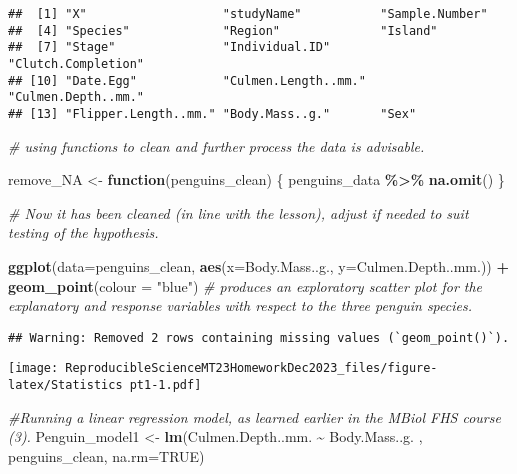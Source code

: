 \documentclass[
]{article}
\newenvironment{Shaded}{\begin{snugshade}}{\end{snugshade}}
\newcommand{\AttributeTok}[1]{\textcolor[rgb]{0.13,0.29,0.53}{#1}}
\newcommand{\CommentTok}[1]{\textcolor[rgb]{0.56,0.35,0.01}{\textit{#1}}}
\newcommand{\ConstantTok}[1]{\textcolor[rgb]{0.56,0.35,0.01}{#1}}
\newcommand{\ControlFlowTok}[1]{\textcolor[rgb]{0.13,0.29,0.53}{\textbf{#1}}}
\newcommand{\FunctionTok}[1]{\textcolor[rgb]{0.13,0.29,0.53}{\textbf{#1}}}
\newcommand{\NormalTok}[1]{#1}
\newcommand{\OtherTok}[1]{\textcolor[rgb]{0.56,0.35,0.01}{#1}}
\newcommand{\SpecialCharTok}[1]{\textcolor[rgb]{0.81,0.36,0.00}{\textbf{#1}}}
\newcommand{\StringTok}[1]{\textcolor[rgb]{0.31,0.60,0.02}{#1}}
\begin{document}
\begin{verbatim}
##  [1] "X"                   "studyName"           "Sample.Number"      
##  [4] "Species"             "Region"              "Island"             
##  [7] "Stage"               "Individual.ID"       "Clutch.Completion"  
## [10] "Date.Egg"            "Culmen.Length..mm."  "Culmen.Depth..mm."  
## [13] "Flipper.Length..mm." "Body.Mass..g."       "Sex"
\end{verbatim}

\begin{Shaded}
\begin{Highlighting}[]
\CommentTok{\# using  functions to clean and further process the data is advisable.}

\NormalTok{remove\_NA }\OtherTok{\textless{}{-}} \ControlFlowTok{function}\NormalTok{(penguins\_clean) \{}
\NormalTok{  penguins\_data }\SpecialCharTok{\%\textgreater{}\%}
    \FunctionTok{na.omit}\NormalTok{()}
\NormalTok{\}}

\CommentTok{\# Now it has been cleaned (in line with the lesson), adjust if needed to suit testing of the hypothesis.}

\FunctionTok{ggplot}\NormalTok{(}\AttributeTok{data=}\NormalTok{penguins\_clean, }\FunctionTok{aes}\NormalTok{(}\AttributeTok{x=}\NormalTok{Body.Mass..g., }\AttributeTok{y=}\NormalTok{Culmen.Depth..mm.)) }\SpecialCharTok{+}
  \FunctionTok{geom\_point}\NormalTok{(}\AttributeTok{colour =} \StringTok{"blue"}\NormalTok{)  }\CommentTok{\# produces an exploratory scatter plot for the explanatory and response variables with respect to the three penguin species.}
\end{Highlighting}
\end{Shaded}

\begin{verbatim}
## Warning: Removed 2 rows containing missing values (`geom_point()`).
\end{verbatim}

\texttt{[image: ReproducibleScienceMT23HomeworkDec2023\_files/figure-latex/Statistics pt1-1.pdf]}

\begin{Shaded}
\end{Shaded}

\begin{Shaded}
\begin{Highlighting}[]
\CommentTok{\#Running a linear regression model, as learned earlier in the MBiol FHS course (3).}
\NormalTok{Penguin\_model1 }\OtherTok{\textless{}{-}} \FunctionTok{lm}\NormalTok{(Culmen.Depth..mm. }\SpecialCharTok{\textasciitilde{}}\NormalTok{ Body.Mass..g. , penguins\_clean, }\AttributeTok{na.rm=}\ConstantTok{TRUE}\NormalTok{)}
\end{Highlighting}
\end{Shaded}
\end{document}

